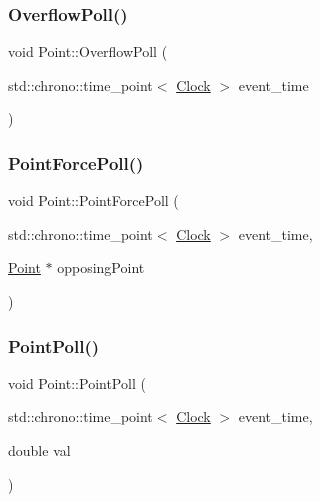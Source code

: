 \mbox{\label{classPoint_a44c69c43cfdcb3273d0e6786a21fd000}} 
\subsubsection{\texorpdfstring{Overflow\+Poll()}{OverflowPoll()}}
{\footnotesize\ttfamily void Point\+::\+Overflow\+Poll (\begin{DoxyParamCaption}\item[{std\+::chrono\+::time\+\_\+point$<$ \mbox{\hyperlink{universe_8h_a0ef8d951d1ca5ab3cfaf7ab4c7a6fd80}{Clock}} $>$}]{event\+\_\+time }\end{DoxyParamCaption})}

\mbox{\label{classPoint_a414f2215f758cd69fa67e8135ecc4fe2}} 
\subsubsection{\texorpdfstring{Point\+Force\+Poll()}{PointForcePoll()}}
{\footnotesize\ttfamily void Point\+::\+Point\+Force\+Poll (\begin{DoxyParamCaption}\item[{std\+::chrono\+::time\+\_\+point$<$ \mbox{\hyperlink{universe_8h_a0ef8d951d1ca5ab3cfaf7ab4c7a6fd80}{Clock}} $>$}]{event\+\_\+time,  }\item[{\mbox{\hyperlink{classPoint}{Point}} $\ast$}]{opposing\+Point }\end{DoxyParamCaption})}

\mbox{\label{classPoint_a026fcbc22b4667e74fea48a9dc6eeb61}} 
\subsubsection{\texorpdfstring{Point\+Poll()}{PointPoll()}}
{\footnotesize\ttfamily void Point\+::\+Point\+Poll (\begin{DoxyParamCaption}\item[{std\+::chrono\+::time\+\_\+point$<$ \mbox{\hyperlink{universe_8h_a0ef8d951d1ca5ab3cfaf7ab4c7a6fd80}{Clock}} $>$}]{event\+\_\+time,  }\item[{double}]{val }\end{DoxyParamCaption})}

